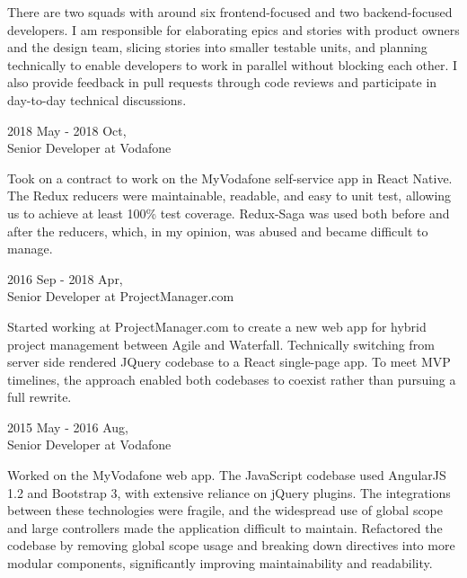 \begin{resume}
There are two squads with around six frontend-focused and two backend-focused developers. I am responsible for elaborating epics and stories with product owners and the design team, slicing stories into smaller testable units, and planning technically to enable developers to work in parallel without blocking each other. I also provide feedback in pull requests through code reviews and participate in day-to-day technical discussions.

\begin{minipage}{\textwidth}
\vspace{0.03in}
\hspace*{-0.25in} 2018 May - 2018 Oct,\\
\hspace*{-0.25in} Senior Developer at Vodafone
\vspace{0.165in}

Took on a contract to work on the MyVodafone self-service app in React Native. The Redux reducers were maintainable, readable, and easy to unit test, allowing us to achieve at least 100\% test coverage. Redux-Saga was used both before and after the reducers, which, in my opinion, was abused and became difficult to manage.
\end{minipage}

\hspace*{-0.25in} 2016 Sep - 2018 Apr,\\
\hspace*{-0.25in} Senior Developer at ProjectManager.com

Started working at ProjectManager.com to create a new web app for hybrid project management between Agile and Waterfall. Technically switching from server side rendered JQuery codebase to a React single-page app. To meet MVP timelines, the approach enabled both codebases to coexist rather than pursuing a full rewrite.

\begin{minipage}{\textwidth}
\vspace{0.03in}
\hspace*{-0.25in} 2015 May - 2016 Aug,\\
\hspace*{-0.25in} Senior Developer at Vodafone
\vspace{0.165in}

Worked on the MyVodafone web app. The JavaScript codebase used AngularJS 1.2 and Bootstrap 3, with extensive reliance on jQuery plugins. The integrations between these technologies were fragile, and the widespread use of global scope and large controllers made the application difficult to maintain. Refactored the codebase by removing global scope usage and breaking down directives into more modular components, significantly improving maintainability and readability.
\end{minipage}


\end{resume}
